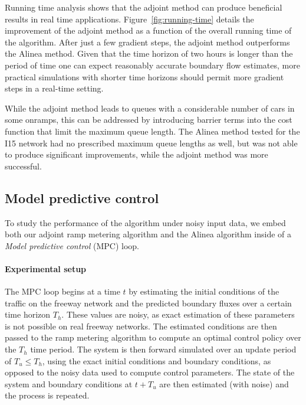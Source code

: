 								
								Running time analysis shows that the adjoint method can produce beneficial
								results in real time applications. Figure~\ref{fig:running-time} details the improvement of the adjoint method as a function of the overall running time of the algorithm. After just a few gradient steps, the
								adjoint method outperforms the Alinea method. Given that the time
								horizon of two hours is longer than the period of time one can expect
								reasonably accurate boundary flow estimates, more practical simulations
								with shorter time horizons should permit more gradient steps in a
								real-time setting.
								
								While the adjoint method leads to queues with a considerable number of cars in some onramps, this can be addressed by introducing barrier terms into the cost function that limit the
								maximum queue length. The Alinea method tested for the I15 network
								had no prescribed maximum queue lengths as well, but was not able
								to produce significant improvements, while the adjoint method was
								more successful.
								
								
								\subsection{Model predictive control\label{sub:Model-predictive-control}}
								
								To study the performance of the algorithm under noisy input data,
								we embed both our adjoint ramp metering algorithm and the Alinea algorithm
								inside of a \emph{Model predictive control }(MPC) loop.
								
								
								\paragraph{Experimental setup}
								
								The MPC loop begins at a time $t$ by estimating the initial conditions
								of the traffic on the freeway network and the predicted boundary fluxes
								over a certain time horizon $T_{h}$. These values are noisy, as exact
								estimation of these parameters is not possible on real freeway networks.
								The estimated conditions are then passed to the ramp metering algorithm
								to compute an optimal control policy over the $T_{h}$ time period.
								The system is then forward simulated over an update period of $T_{u}\le T_{h}$,
								using the exact initial conditions and boundary conditions, as opposed
								to the noisy data used to compute control parameters. The state of
								the system and boundary conditions at $t+T_{u}$ are then estimated
								(with noise) and the process is repeated.
								
